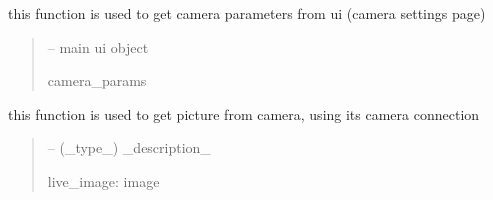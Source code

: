 \documentclass[letterpaper,10pt,english]{sphinxmanual}
\begin{document}

\begin{savenotes}\begin{fulllineitems}
\label{\detokenize{setting/backend/camera_funcs:oxin.backend.camera_funcs.get_camera_params_from_ui}}
\pysigstartsignatures
{}
\pysigstopsignatures
\sphinxAtStartPar
this function is used to get camera parameters from ui (camera settings page)
\begin{quote}\begin{description}
\sphinxAtStartPar
{} – main ui object

\sphinxAtStartPar
camera\_params

\end{description}\end{quote}

\end{fulllineitems}\end{savenotes}


\begin{savenotes}\begin{fulllineitems}
\label{\detokenize{setting/backend/camera_funcs:oxin.backend.camera_funcs.get_picture_from_camera}}
\pysigstartsignatures
{}
\pysigstopsignatures
\sphinxAtStartPar
this function is used to get picture from camera, using its camera connection
\begin{quote}\begin{description}
\sphinxAtStartPar
{} – (\_type\_) \_description\_

\sphinxAtStartPar
live\_image: image

\end{description}\end{quote}

\end{fulllineitems}\end{savenotes}
\end{document}
